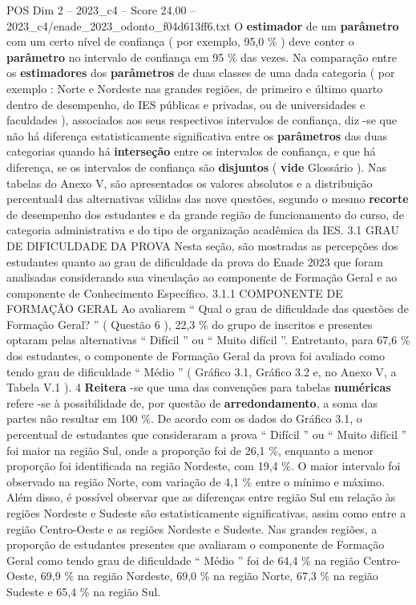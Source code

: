 \begin{textsample}{POS Dim 2 – 2023\_c4 – Score 24.00 – 2023\_c4/enade\_2023\_odonto\_f04d613ff6.txt}
O \textbf{estimador} de um \textbf{parâmetro} com um certo nível de confiança ( por exemplo, 95,0 \% ) deve conter o \textbf{parâmetro} no intervalo de confiança em 95 \% das vezes.
Na comparação entre os \textbf{estimadores} dos \textbf{parâmetros} de duas classes de uma dada categoria ( por exemplo : Norte e Nordeste nas grandes regiões, de primeiro e último quarto dentro de desempenho, de IES públicas e privadas, ou de universidades e faculdades ), associados aos seus respectivos intervalos de confiança, diz -se que não há diferença estatisticamente significativa entre os \textbf{parâmetros} das duas categorias quando há \textbf{interseção} entre os intervalos de confiança, e que há diferença, se os intervalos de confiança são \textbf{disjuntos} ( \textbf{vide} Glossário ).
Nas tabelas do Anexo V, são apresentados os valores absolutos e a distribuição percentual4 das alternativas válidas das nove questões, segundo o mesmo \textbf{recorte} de desempenho dos estudantes e da grande região de funcionamento do curso, de categoria administrativa e do tipo de organização acadêmica da IES. 3.1 GRAU DE DIFICULDADE DA PROVA Nesta seção, são mostradas as percepções dos estudantes quanto ao grau de dificuldade da prova do Enade 2023 que foram analisadas considerando sua vinculação ao componente de Formação Geral e ao componente de Conhecimento Específico. 3.1.1 COMPONENTE DE FORMAÇÃO GERAL Ao avaliarem “ Qual o grau de dificuldade das questões de Formação Geral? ” ( Questão 6 ), 22,3 \% do grupo de inscritos e presentes optaram pelas alternativas “ Difícil ” ou “ Muito difícil ”.
Entretanto, para 67,6 \% dos estudantes, o componente de Formação Geral da prova foi avaliado como tendo grau de dificuldade “ Médio ” ( Gráfico 3.1, Gráfico 3.2 e, no Anexo V, a Tabela V.1 ). 4 \textbf{Reitera} -se que uma das convenções para tabelas \textbf{numéricas} refere -se à possibilidade de, por questão de \textbf{arredondamento}, a soma das partes não resultar em 100 \%.
De acordo com os dados do Gráfico 3.1, o percentual de estudantes que consideraram a prova “ Difícil ” ou “ Muito difícil ” foi maior na região Sul, onde a proporção foi de 26,1 \%, enquanto a menor proporção foi identificada na região Nordeste, com 19,4 \%.
O maior intervalo foi observado na região Norte, com variação de 4,1 \% entre o mínimo e máximo.
Além disso, é possível observar que as diferenças entre região Sul em relação às regiões Nordeste e Sudeste são estatisticamente significativas, assim como entre a região Centro-Oeste e as regiões Nordeste e Sudeste.
Nas grandes regiões, a proporção de estudantes presentes que avaliaram o componente de Formação Geral como tendo grau de dificuldade “ Médio ” foi de 64,4 \% na região Centro-Oeste, 69,9 \% na região Nordeste, 69,0 \% na região Norte, 67,3 \% na região Sudeste e 65,4 \% na região Sul.

\end{textsample}
